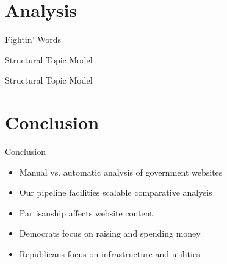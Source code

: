 \documentclass[12pt]{beamer}
\begin{document}
\section{Analysis}


\begin{frame}{Fightin' Words}
\end{frame}

%

\begin{frame}{Structural Topic Model}
\end{frame}

\begin{frame}{Structural Topic Model}
\end{frame}

\section{Conclusion}
\begin{frame}{Conclusion}
\linespread{1.5}
\large
\begin{itemize}
	\item Manual vs. automatic analysis of government websites
	\item Our pipeline facilities scalable comparative analysis
	
	\vspace{5mm}
	\item Partisanship affects website content:
	\item Democrats focus on raising and spending money
	\item Republicans focus on infrastructure and utilities
\end{itemize}
\end{frame}
\end{document}
